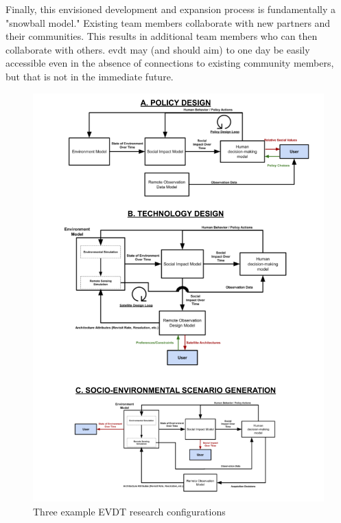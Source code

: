 Finally, this envisioned development and expansion process is fundamentally a "snowball model." Existing team members collaborate with new partners and their communities. This results in additional team members who can then collaborate with others. \ac{evdt} may (and should aim) to one day be easily accessible even in the absence of connections to existing community members, but that is not in the immediate future.

\clearpage
\begin{figure}[h]
	\centering
	\includegraphics[scale=0.5]{Figures/chap3/Loops_Combined.png}
	\caption{Three example EVDT research configurations}
	\label{fig:combo}
\end{figure}
\clearpage









